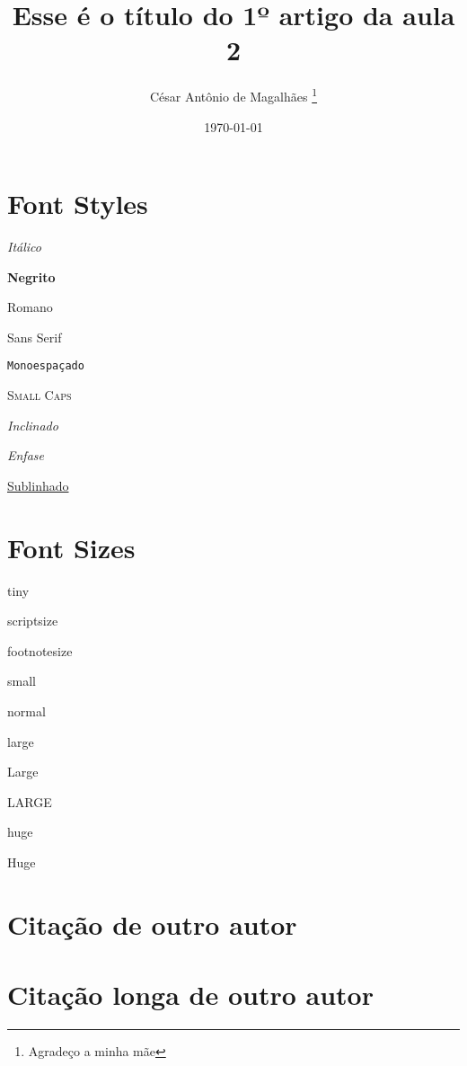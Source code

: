 \documentclass[12pt, a4paper]{article}
\title{Esse é o título do 1º artigo da aula 2}
\author{César Antônio de Magalhães \thanks{Agradeço a minha mãe}}
\date{\today}
\begin{document}
\section{Font Styles}
\textit{Itálico}\hspace{1cm}{\it Itálico}

\textbf{Negrito}\hspace{1cm}{\bf Negrito}

\textrm{Romano}\hspace{1cm}{\rm Romano}

\textsf{Sans Serif}\hspace{1cm}{\sf Sans Serif}

\texttt{Monoespaçado}\hspace{1cm}{\tt Monoespaçado}

\textsc{Small Caps}\hspace{1cm}{\sc Small Caps}

\textsl{Inclinado}\hspace{1cm}{\sl Inclinado}

\emph{Enfase}

\underline{Sublinhado}

\section{Font Sizes}
{\tiny tiny}

{\scriptsize scriptsize}

{\footnotesize footnotesize}

{\small small}

normal

{\large large}

{\Large Large}

{\LARGE LARGE}

{\huge huge}

{\Huge Huge}

\section{Citação de outro autor}
\lipsum[1]
\begin{quote}
	\lipsum[2]
\end{quote}

\section{Citação longa de outro autor}
\lipsum[1]
\begin{quotation}
	\lipsum[2]
\end{quotation}
\end{document}
